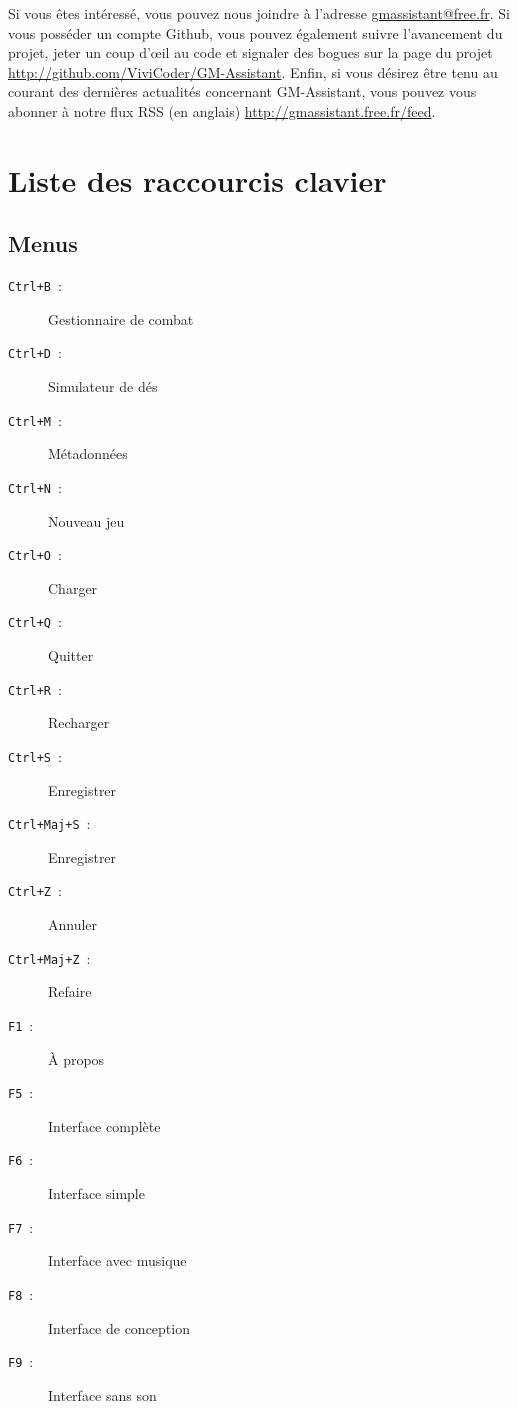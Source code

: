 \documentclass[a4paper,12pt]{article}
\newcommand*{\interfaceitem}[1]{\texttt{#1}}
\begin{document}
Si vous êtes intéressé, vous pouvez nous joindre à l'adresse \url{gmassistant@free.fr}.
Si vous posséder un compte Github, vous pouvez également suivre l'avancement du projet, jeter un coup d'œil au code et signaler des bogues sur la page du projet \url{http://github.com/ViviCoder/GM-Assistant}.
Enfin, si vous désirez être tenu au courant des dernières actualités concernant GM-Assistant, vous pouvez vous abonner à notre flux RSS (en anglais) \url{http://gmassistant.free.fr/feed}.

\appendix

\section{Liste des raccourcis clavier}

\subsection{Menus}

\begin{description}
    \item[\interfaceitem{Ctrl+B}~:]{Gestionnaire de combat}
    \item[\interfaceitem{Ctrl+D}~:]{Simulateur de dés}
    \item[\interfaceitem{Ctrl+M}~:]{Métadonnées}
    \item[\interfaceitem{Ctrl+N}~:]{Nouveau jeu}
    \item[\interfaceitem{Ctrl+O}~:]{Charger}
    \item[\interfaceitem{Ctrl+Q}~:]{Quitter}
    \item[\interfaceitem{Ctrl+R}~:]{Recharger}
    \item[\interfaceitem{Ctrl+S}~:]{Enregistrer}
    \item[\interfaceitem{Ctrl+Maj+S}~:]{Enregistrer}
    \item[\interfaceitem{Ctrl+Z}~:]{Annuler}
    \item[\interfaceitem{Ctrl+Maj+Z}~:]{Refaire}
    \item[\interfaceitem{F1}~:]{À propos}
    \item[\interfaceitem{F5}~:]{Interface complète}
    \item[\interfaceitem{F6}~:]{Interface simple}
    \item[\interfaceitem{F7}~:]{Interface avec musique}
    \item[\interfaceitem{F8}~:]{Interface de conception}
    \item[\interfaceitem{F9}~:]{Interface sans son}
\end{description}
\end{document}
